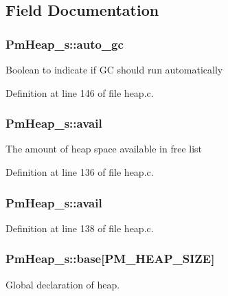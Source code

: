 \subsection{Field Documentation}
\hypertarget{struct_pm_heap__s_a553d5a18727fb75341f9b13e722c0426}{
\subsubsection[{auto\-\_\-gc}]{ Pm\-Heap\-\_\-s\-::auto\-\_\-gc}}\label{struct_pm_heap__s_a553d5a18727fb75341f9b13e722c0426}
Boolean to indicate if G\-C should run automatically 

Definition at line 146 of file heap.\-c.

\hypertarget{struct_pm_heap__s_acb9c0e763130e1b4efd9d45689f721b2}{
\subsubsection[{avail}]{ Pm\-Heap\-\_\-s\-::avail}}\label{struct_pm_heap__s_acb9c0e763130e1b4efd9d45689f721b2}
The amount of heap space available in free list 

Definition at line 136 of file heap.\-c.

\hypertarget{struct_pm_heap__s_aee628bdf2886b2fa5ff3dae1506cde2c}{
\subsubsection[{avail}]{ Pm\-Heap\-\_\-s\-::avail}}\label{struct_pm_heap__s_aee628bdf2886b2fa5ff3dae1506cde2c}


Definition at line 138 of file heap.\-c.

\hypertarget{struct_pm_heap__s_a865b0a08acab0ab3e3bf5c87781266e1}{
\subsubsection[{base}]{ Pm\-Heap\-\_\-s\-::base\mbox{[}P\-M\-\_\-\-H\-E\-A\-P\-\_\-\-S\-I\-Z\-E\mbox{]}}}\label{struct_pm_heap__s_a865b0a08acab0ab3e3bf5c87781266e1}
Global declaration of heap. 


